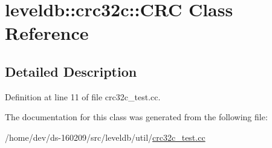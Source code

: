 \hypertarget{classleveldb_1_1crc32c_1_1_c_r_c}{}\section{leveldb\+:\+:crc32c\+:\+:C\+R\+C Class Reference}
\label{classleveldb_1_1crc32c_1_1_c_r_c}


\subsection{Detailed Description}


Definition at line 11 of file crc32c\+\_\+test.\+cc.



The documentation for this class was generated from the following file\+:\begin{DoxyCompactItemize}
\item 
/home/dev/ds-\/160209/src/leveldb/util/\hyperlink{crc32c__test_8cc}{crc32c\+\_\+test.\+cc}\end{DoxyCompactItemize}
